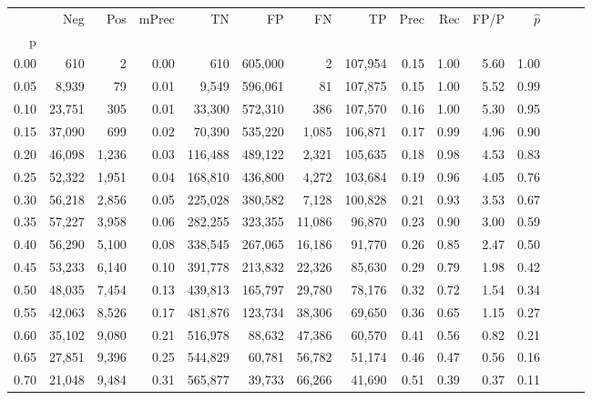 \begin{tabular}{rrrrrrrrrrrrrrr}
\toprule
{} &     Neg &    Pos & mPrec &       TN &       FP &       FN &       TP &  Prec &   Rec &  FP/P & $\hat{p}$ \\
p    &         &        &       &          &          &          &          &       &       &       &           \\
\midrule
0.00 &     610 &      2 &  0.00 &      610 &  605,000 &        2 &  107,954 &  0.15 &  1.00 &  5.60 &      1.00 \\
0.05 &   8,939 &     79 &  0.01 &    9,549 &  596,061 &       81 &  107,875 &  0.15 &  1.00 &  5.52 &      0.99 \\
0.10 &  23,751 &    305 &  0.01 &   33,300 &  572,310 &      386 &  107,570 &  0.16 &  1.00 &  5.30 &      0.95 \\
0.15 &  37,090 &    699 &  0.02 &   70,390 &  535,220 &    1,085 &  106,871 &  0.17 &  0.99 &  4.96 &      0.90 \\
0.20 &  46,098 &  1,236 &  0.03 &  116,488 &  489,122 &    2,321 &  105,635 &  0.18 &  0.98 &  4.53 &      0.83 \\
0.25 &  52,322 &  1,951 &  0.04 &  168,810 &  436,800 &    4,272 &  103,684 &  0.19 &  0.96 &  4.05 &      0.76 \\
0.30 &  56,218 &  2,856 &  0.05 &  225,028 &  380,582 &    7,128 &  100,828 &  0.21 &  0.93 &  3.53 &      0.67 \\
0.35 &  57,227 &  3,958 &  0.06 &  282,255 &  323,355 &   11,086 &   96,870 &  0.23 &  0.90 &  3.00 &      0.59 \\
0.40 &  56,290 &  5,100 &  0.08 &  338,545 &  267,065 &   16,186 &   91,770 &  0.26 &  0.85 &  2.47 &      0.50 \\
0.45 &  53,233 &  6,140 &  0.10 &  391,778 &  213,832 &   22,326 &   85,630 &  0.29 &  0.79 &  1.98 &      0.42 \\
0.50 &  48,035 &  7,454 &  0.13 &  439,813 &  165,797 &   29,780 &   78,176 &  0.32 &  0.72 &  1.54 &      0.34 \\
0.55 &  42,063 &  8,526 &  0.17 &  481,876 &  123,734 &   38,306 &   69,650 &  0.36 &  0.65 &  1.15 &      0.27 \\
0.60 &  35,102 &  9,080 &  0.21 &  516,978 &   88,632 &   47,386 &   60,570 &  0.41 &  0.56 &  0.82 &      0.21 \\
0.65 &  27,851 &  9,396 &  0.25 &  544,829 &   60,781 &   56,782 &   51,174 &  0.46 &  0.47 &  0.56 &      0.16 \\
0.70 &  21,048 &  9,484 &  0.31 &  565,877 &   39,733 &   66,266 &   41,690 &  0.51 &  0.39 &  0.37 &      0.11 \\

\end{tabular}
